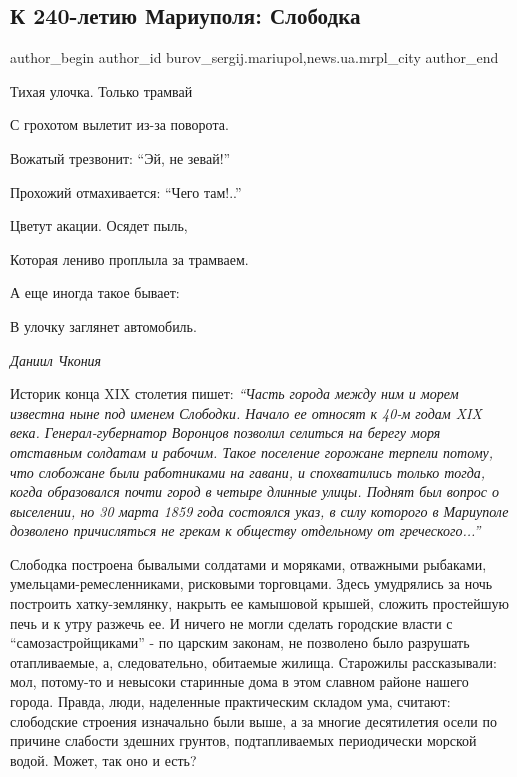  
 
 
 
 
 
\subsection{К 240-летию Мариуполя: Слободка}
\label{sec:25_08_2018.stz.news.ua.mrpl_city.1.k_240_letiju_mariupolja_slobodka}
 
\ifcmt
 author_begin
   author_id burov_sergij.mariupol,news.ua.mrpl_city
 author_end
\fi

Тихая улочка. Только трамвай

С грохотом вылетит из-за поворота.

Вожатый трезвонит: \enquote{Эй, не зевай!}

Прохожий отмахивается: \enquote{Чего там!..}

Цветут акации. Осядет пыль,

Которая лениво проплыла за трамваем.

А еще иногда такое бывает:

В улочку заглянет автомобиль.

\emph{Даниил Чкония}

Историк конца XIX столетия пишет: \emph{\enquote{Часть города между ним и морем известна ныне
под именем Слободки. Начало ее относят к 40-м годам XIX века.
Генерал-губернатор Воронцов позволил селиться на берегу моря отставным солдатам
и рабочим. Такое поселение горожане терпели потому, что слобожане были
работниками на гавани, и спохватились только тогда, когда образовался почти
город в четыре длинные улицы. Поднят был вопрос о выселении, но 30 марта 1859
года состоялся указ, в силу которого в Мариуполе дозволено причисляться не
грекам к обществу отдельному от греческого...}}


Слободка построена бывалыми солдатами и моряками, отважными рыбаками,
умельцами-ремесленниками, рисковыми торговцами. Здесь умудрялись за ночь
построить хатку-землянку, накрыть ее камышовой крышей, сложить простейшую печь
и к утру разжечь ее. И ничего не могли сделать городские власти с
\enquote{самозастройщиками} - по царским законам, не позволено было разрушать
отапливаемые, а, следовательно, обитаемые жилища. Старожилы рассказывали: мол,
потому-то и невысоки старинные дома в этом славном районе нашего города.
Правда, люди, наделенные практическим складом ума, считают: слободские строения
изначально были выше, а за многие десятилетия осели по причине слабости здешних
грунтов, подтапливаемых периодически морской водой. Может, так оно и есть?

